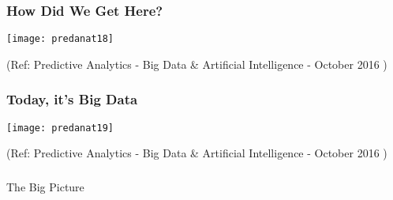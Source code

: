 \begin{frame}\frametitle{How	Did	We	Get	Here?}

\begin{center}
\texttt{[image: predanat18]}
\end{center}

{\tiny (Ref: Predictive Analytics - Big	Data	\&	Artificial	Intelligence - October 2016 )}

\end{frame}

\begin{frame}\frametitle{Today,	it's	Big	Data}

\begin{center}
\texttt{[image: predanat19]}
\end{center}

{\tiny (Ref: Predictive Analytics - Big	Data	\&	Artificial	Intelligence - October 2016 )}

\end{frame}










\begin{frame}[fragile]\frametitle{}
\begin{center}
{\Large The Big Picture}
\end{center}
\end{frame}



